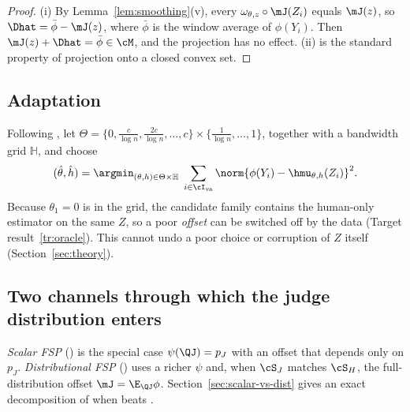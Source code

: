 \begin{proof}
(i) By Lemma~\ref{lem:smoothing}(v), every $\omega_{\theta,z}\circ\mJ(Z_i)$ equals $\mJ(z)$, so
$\Dhat=\bar\phi-\mJ(z)$, where $\bar\phi$ is the window average of $\phi(Y_i)$. Then
$\mJ(z)+\Dhat=\bar\phi\in\cM$, and the projection has no effect.
(ii) is the standard property of projection onto a closed convex set.
\end{proof}

\subsection{Adaptation}

Following \citet{li2026personalizing}, let
$\Theta=\{0,\tfrac{c}{\log n},\tfrac{2c}{\log n},\dots,c\}\times\{\tfrac{1}{\log n},\dots,1\}$,
together with a bandwidth grid $\mathbb H$, and choose
\[
  (\hat\theta,\hat h)=\argmin_{(\theta,h)\in\Theta\times\mathbb H}\;
  \sum_{i\in\cI_{\mathrm{va}}}\norm{\phi(Y_i)-\hmu_{\theta,h}(Z_i)}^2 .
\]
Because $\theta_1=0$ is in the grid, the candidate family contains the human-only estimator on the
same $Z$, so a poor \emph{offset} can be switched off by the data (Target result~\ref{tr:oracle}).
This cannot undo a poor choice or corruption of $Z$ itself (Section~\ref{sec:theory}).

\subsection{Two channels through which the judge distribution enters}
\label{sec:two-channels}


\emph{Scalar FSP} (\sfsp) is the special case $\psi(\QJ)=p_J$ with an offset that depends only on
$p_J$. \emph{Distributional FSP} (\dfsp) uses a richer $\psi$ and, when $\cS_J$ matches $\cS_H$, the
full-distribution offset $\mJ=\E_{\QJ}\phi$. Section~\ref{sec:scalar-vs-dist} gives an exact
decomposition of when \dfsp{} beats \sfsp.

